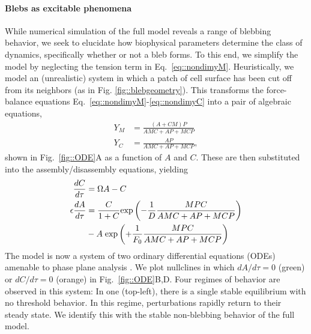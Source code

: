 \paragraph{Blebs as excitable phenomena}

While numerical simulation of the full model reveals a range of blebbing behavior, we seek to elucidate how biophysical parameters determine the class of dynamics, specifically whether or not a bleb forms. To this end, we simplify the model by neglecting the tension term in Eq.~\ref{eq::nondimyM}. Heuristically, we model an (unrealistic) system in which a patch of cell surface has been cut off from its neighbors (as in Fig. \ref{fig::blebgeometry}). This transforms the force-balance equations Eq.~\ref{eq::nondimyM}-\ref{eq::nondimyC} into a pair of algebraic equations,
\begin{align}
Y_M &= \frac{(A+CM)P}{A MC + AP + MCP}\label{eq::ODEyM}\\
Y_C &= \frac{AP}{A MC + AP + MCP}\label{eq::ODEyC},
\end{align}
shown in Fig.~\ref{fig::ODE}A as a function of $A$ and $C$. These are then substituted into the assembly/disassembly equations, yielding
\begin{align}
\frac{d C}{d \tau} &= \Omega A - C \label{eq::ODEC}\\
\epsilon \frac{d A}{d \tau} &= \frac{C}{1+C} \mbox{exp}\left( -\frac{1}{D} \frac{MP C}{A MC + AP + MCP}\right) \notag\\
 &- A\; \mbox{exp}\left( + \frac{1}{F_0}\frac{MP C}{A MC + AP + MCP}\right) \label{eq::ODEA}
\end{align}
The model is now a system of two ordinary differential equations (ODEs) amenable to phase plane analysis \cite{Keshet}. We plot nullclines in which $dA/d\tau=0$ (green) or $dC/d\tau=0$ (orange) in Fig.~\ref{fig::ODE}B,D.
Four regimes of behavior are observed in this system: 
In one (top-left), there is a single stable equilibrium with no threshold behavior. In this regime, perturbations rapidly return to their steady state. We identify this with the stable non-blebbing behavior of the full model. 

